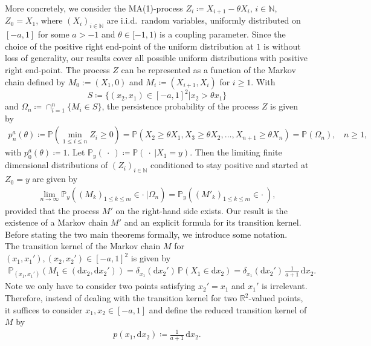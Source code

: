 \documentclass[12pt]{article}
\newcommand{\N}{\mathbb{N}} %
\newcommand{\R}{\mathbb{R}} %
\renewcommand{\P}{\mathbb{P}} %
\newcommand{\1}{\mathds{1}}
\renewcommand{\d}{\mathrm{d}}
\theoremstyle{definition}
\theoremstyle{plain}
\theoremstyle{remark}
\begin{document}
More concretely, we consider the MA(1)-process  $Z_i\coloneqq X_{i+1}-\theta X_i$, $i\in\N$, $Z_0=X_1$, where $(X_i)_{i\in\N}$ are i.i.d.\ random variables, uniformly distributed on $[-a,1]$ for some $a>-1$ and $\theta\in[-1,1)$ is a coupling parameter. Since the choice of the positive right end-point of the uniform distribution at $1$ is without loss of generality, our results cover all possible uniform distributions with positive right end-point. The process $Z$ can be represented as a function of the Markov chain defined by $M_0:=(X_1,0)$ and  $M_i\coloneqq(X_{i+1},X_i)$ for $i\geq 1$. With $$S\coloneqq \{(x_2,x_1)\in [-a,1]^2| x_2>\theta x_1\}$$ and $\Omega_n\coloneqq \cap_{i=1}^n\{M_i\in S\}$, the persistence probability of the process $Z$ is given by
    \begin{align*}
    p_n^a(\theta)\coloneqq \P(\min_{1\leq i\leq n} Z_i\geq 0)=\P(X_2\geq\theta X_1,X_3\geq\theta X_2,\dots,X_{n+1}\geq\theta X_n)=\P(\Omega_n),~~~~n\ge 1,
\end{align*} with $p_0^a(\theta)\coloneqq 1$.
Let $\P_y(~\cdot~)\coloneqq\P(~\cdot~|X_1=y)$. Then the limiting finite dimensional distributions of $(Z_i)_{i\in\N}$ conditioned to stay positive and started at $Z_0=y$ are given by
\begin{align}\label{def_lim_process}
    \lim_{n\to\infty}\P_y((M_k)_{1\leq k\leq m}\in\cdot~|\Omega_n)=\P_y((M'_k)_{1\leq k\leq m}\in\cdot~),
\end{align}
provided that the process $M'$ on the right-hand side exists. 
Our result is the existence of a Markov chain $M'$ and an explicit formula for its transition kernel. Before stating the two main theorems formally, we introduce some notation.
\\The transition kernel of the Markov chain $M$ for $(x_1,x_1'),(x_2,x_2')\in[-a,1]^2$ is given by
\begin{align}\label{trans_prob_MC-2dim}
     \P_{(x_1,x_1')}(M_1\in (\d x_2,\d x_2'))=\delta_{x_1}(\d x_2') \, \P(X_1\in \d x_2)=\delta_{x_1}(\d x_2') \, \frac{1}{a+1}\,\d x_2.
\end{align} 
Note we only have to consider two points satisfying $x_2'=x_1$ and $x_1'$ is irrelevant. Therefore, instead of dealing with the transition kernel for two $\R^2$-valued points, it suffices to consider $x_1, x_2\in [-a,1]$ and define the reduced transition kernel of $M$ by
   \begin{align*}
       p(x_1,\d x_2)\coloneqq \frac{1}{a+1}\,\d x_2.
   \end{align*}
\end{document}
